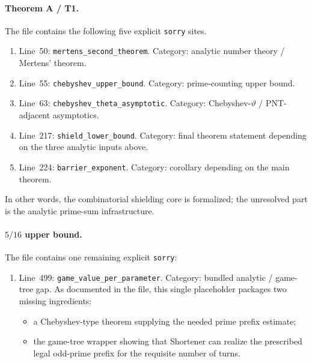 \paragraph{Theorem A / T1.}
The file
contains the following five explicit \texttt{sorry} sites.
\begin{enumerate}
  \item Line~50: \texttt{mertens\_second\_theorem}.  Category: analytic number
  theory / Mertens' theorem.
  \item Line~55: \texttt{chebyshev\_upper\_bound}.  Category: prime-counting
  upper bound.
  \item Line~63: \texttt{chebyshev\_theta\_asymptotic}.  Category:
  Chebyshev-$\vartheta$ / PNT-adjacent asymptotics.
  \item Line~217: \texttt{shield\_lower\_bound}.  Category: final theorem
  statement depending on the three analytic inputs above.
  \item Line~224: \texttt{barrier\_exponent}.  Category: corollary depending on
  the main theorem.
\end{enumerate}

In other words, the combinatorial shielding core is formalized; the unresolved
part is the analytic prime-sum infrastructure.

\paragraph{$5/16$ upper bound.}
The file
contains one remaining explicit \texttt{sorry}:
\begin{enumerate}
  \item Line~499: \texttt{game\_value\_per\_parameter}.  Category: bundled
  analytic / game-tree gap.  As documented in the file, this single placeholder
  packages two missing ingredients:
  \begin{itemize}
    \item a Chebyshev-type theorem supplying the needed prime prefix estimate;
    \item the game-tree wrapper showing that Shortener can realize the
    prescribed legal odd-prime prefix for the requisite number of turns.
  \end{itemize}
\end{enumerate}

